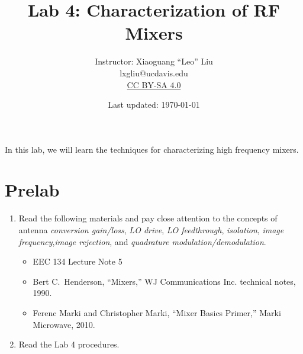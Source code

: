 \documentclass[letterpaper, 11pt]{article}
\begin{document}
\title{Lab 4: Characterization of RF Mixers}
\author{Instructor: Xiaoguang ``Leo'' Liu\\lxgliu@ucdavis.edu \\
	\small \href{http://creativecommons.org/licenses/by-sa/4.0/}{CC BY-SA 4.0}}
\date{Last updated: \today}

\maketitle

In this lab, we will learn the techniques for characterizing high frequency mixers. 

%


\section{Prelab}
\begin{enumerate}
	\item Read the following materials and pay close attention to the concepts of antenna \textit{conversion gain/loss}, \textit{LO drive}, \textit{LO feedthrough}, \textit{isolation}, \textit{image frequency},\textit{image rejection}, and \textit{quadrature modulation/demodulation}. 
	\begin{itemize}
		\item EEC 134 Lecture Note 5 
		
		\item Bert C.~Henderson, ``Mixers,'' WJ Communications Inc. technical notes, 1990. 
		\item Ferenc Marki and Christopher Marki, ``Mixer Basics Primer,'' Marki Microwave, 2010.
	\end{itemize}
	\item Read the Lab 4 procedures. 

\end{enumerate}
\end{document}
